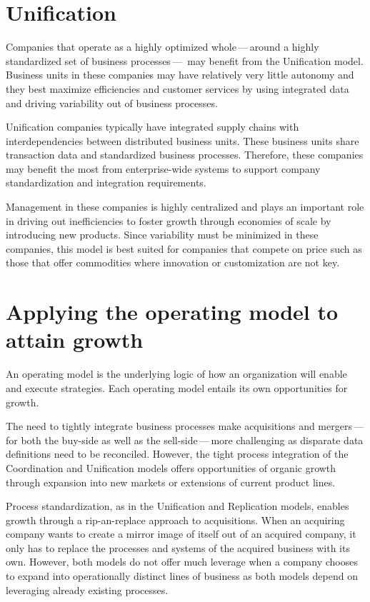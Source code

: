 \section*{Unification}

Companies that operate as a highly optimized whole\,---\,around a highly standardized set of business processes\,---\,%
may benefit from the Unification model.
Business units in these companies may have relatively very little autonomy and they best maximize efficiencies and
customer services by using integrated data and driving variability out of business processes.

Unification companies typically have integrated supply chains with interdependencies between distributed business units.
These business units share transaction data and standardized business processes.
Therefore, these companies may benefit the most from enterprise-wide systems to support company standardization
and integration requirements.

Management in these companies is highly centralized and plays an important role in driving out inefficiencies to
foster growth through economies of scale by introducing new products.
Since variability must be minimized in these companies,
this model is best suited for companies that compete on price such as those that offer commodities where
innovation or customization are not key.

\section*{Applying the operating model to attain growth}

An operating model is the underlying logic of how an organization will enable and execute strategies.
Each operating model entails its own opportunities for growth.

The need to tightly integrate business processes make acquisitions and mergers\,---\,for both the buy-side as well
as the sell-side\,---\,more challenging as disparate data definitions need to be reconciled.
However, the tight process integration of the Coordination and Unification models offers opportunities of
organic growth through expansion into new markets or extensions of current product lines.

Process standardization, as in the Unification and Replication models, enables growth through a
rip-an-replace approach to acquisitions.
When an acquiring company wants to create a mirror image of itself out of an acquired company,
it only has to replace the processes and systems of the acquired business with its own.
However, both models do not offer much leverage when a company chooses to expand into operationally
distinct lines of business as both models depend on leveraging already existing processes.

